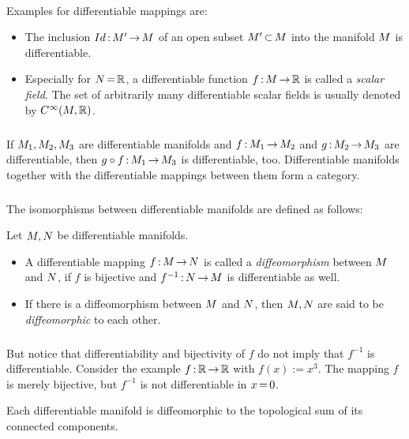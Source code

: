 \documentclass[11pt,twoside]{article}
\begin{document}
\paragraph{}
Examples for differentiable mappings are:

\begin{itemize}[leftmargin=15pt]
\item[1.]
The inclusion $Id {\,:\,} {M}' {\,\to\,} {M}$ of an open subset
${M}' {\,\subset\,} {M}$ into the manifold ${M}$ is differentiable.
\item[2.]
Especially for ${N} {\,=\,} {\mathbb{R}}$,
a differentiable function $f{\,:\,} {M} {\,\to\,} {\mathbb{R}}$ is called a \textit{scalar field}.
The set of arbitrarily many differentiable scalar fields is usually
denoted by $C^{\infty}({M},{\mathbb{R}})$.
\end{itemize}

\subparagraph{}
If ${M}_1,{M}_2,{M}_3$ are differentiable manifolds and
$f{\,:\,} {M}_1 {\,\to\,} {M}_2$ and $g {\,:\,} {M}_2 {\,\to\,} {M}_3$ are differentiable,
then $g \circ f {\,:\,} {M}_1 {\,\to\,} {M}_3$ is differentiable,
too.
Differentiable manifolds together with the differentiable mappings between them
form a category.

\subparagraph{}
The isomorphisms between differentiable manifolds are defined as follows:

\begin{definition}
Let ${M},{N}$ be differentiable manifolds.

\begin{itemize}[leftmargin=15pt]
\item[1.]
A differentiable mapping $f {\,:\,} {M} {\,\to\,} {N}$ is called
a \textit{diffeomorphism} between ${M}$ and ${N}$,
if $f$ is bijective and $f^{-1} {\,:\,} {N} {\,\to\,} {M}$ is differentiable as well.

\item[2.]
If there is a diffeomorphism between ${M}$ and ${N}$,
then ${M},{N}$ are said to be \textit{diffeomorphic} to each other.
\end{itemize}
\end{definition}

\subparagraph{}
But notice
that differentiability and bijectivity of $f$ do not imply
that $f^{-1}$ is differentiable.
Consider the example $f {\,:\,} {\mathbb{R}} {\,\to\,} {\mathbb{R}}$ with $f(x) := x^3$.
The mapping $f$ is merely bijective,
but $f^{-1}$ is not differentiable in $x {\,=\,} 0$.

\begin{example}
Each differentiable manifold is diffeomorphic
to the topological sum of its connected components.
\end{example}
\end{document}
